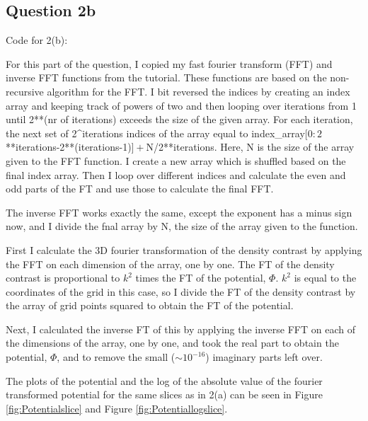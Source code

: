 \subsection{Question 2b}

Code for 2(b):


For this part of the question, I copied my fast fourier transform (FFT) and inverse FFT functions from the tutorial.
These functions are based on the non-recursive algorithm for the FFT.
I bit reversed the indices by creating an index array and keeping track of powers of two and then looping over iterations from 1 until 2**(nr of iterations) exceeds the size of the given array.
For each iteration, the next set of 2^iterations indices of the array equal to index_array$[0:2$**iterations-2**(iterations-1)$]+$N/2**iterations.
Here, N is the size of the array given to the FFT function.
I create a new array which is shuffled based on the final index array.
Then I loop over different indices and calculate the even and odd parts of the FT and use those to calculate the final FFT.

The inverse FFT works exactly the same, except the exponent has a minus sign now, and I divide the fnal array by N, the size of the array given to the function.

First I calculate the 3D fourier transformation of the density contrast by applying the FFT on each dimension of the array, one by one.
The FT of the density contrast is proportional to $k^2$ times the FT of the potential, $\Phi$.
$k^2$ is equal to the coordinates of the grid in this case, so I divide the FT of the density contrast by the array of grid points squared to obtain the FT of the potential.

Next, I calculated the inverse FT of this by applying the inverse FFT on each of the dimensions of the array, one by one, and took the real part to obtain the potential, $\Phi$, and to remove the small ($\sim 10^{-16}$) imaginary parts left over.

The plots of the potential and the log of the absolute value of the fourier transformed potential for the same slices as in 2(a) can be seen in Figure \ref{fig:Potentialslice} and Figure \ref{fig:Potentiallogslice}.

